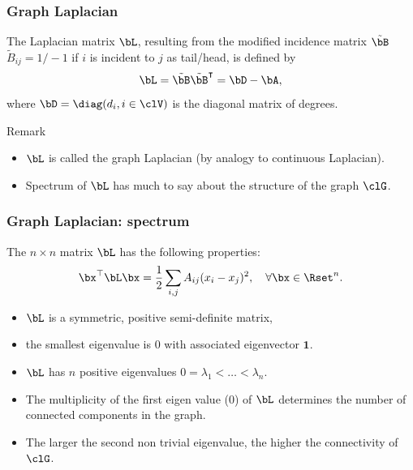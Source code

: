 \begin{frame}
  \frametitle{Graph Laplacian}

  \begin{definition}
    The Laplacian matrix $\bL$, resulting from the modified incidence matrix $\tilde\bB$ $\tilde{\! B}_{ij}= 1/-1$ if $i$ is incident to $j$ as tail/head, is defined by 
    \[
      \bL = \tilde \bB \tilde \bB^\intercal = \bD - \bA,
    \]
    where $\bD = \diag(d_i, i\in\clV)$ is the diagonal matrix of degrees. 
  \end{definition}

  \begin{block}{Remark}
    \begin{itemize}
    \item $\bL$ is called the graph Laplacian (by analogy to continuous Laplacian).
    \item Spectrum of $\bL$ has much to say about the structure of the graph $\clG$.
    \end{itemize}
  \end{block}

\end{frame}

\begin{frame}
  \frametitle{Graph Laplacian: spectrum}

  \begin{proposition}[Spectrum of $\bL$]
    The $n\times n$ matrix $\bL$ has the following properties:
    \[
      \bx^\top \bL \bx = \frac{1}{2} \sum_{i,j} A_{ij} (x_i - x_j)^2, \quad \forall \bx\in\Rset^n .
    \]
    \vspace{-.25cm}
    \begin{itemize}
      \item $\bL$ is a symmetric, positive semi-definite matrix,
      \item  the smallest eigenvalue is $0$ with associated eigenvector $\mathbf{1}$.
      \item $\bL$ has $n$ positive eigenvalues $0=\lambda_1<\dots <\lambda_n$. 
    \end{itemize}  
  \end{proposition}

  \begin{corollary}
    \vspace{-.25cm}
    \begin{itemize}
      \item The multiplicity of the first eigen value ($0$) of $\bL$ determines the number of connected components in the graph.
      \item The larger the second non trivial eigenvalue, the higher the connectivity of $\clG$.
    \end{itemize}  
  \end{corollary}

\end{frame}

